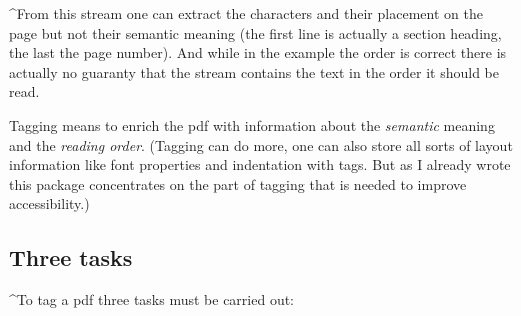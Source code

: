 \documentclass[DIV=12,parskip=half-,bibliography=totoc]{scrartcl}
\begin{document}
\TagP^From this stream one can extract the characters and their placement on the page but not their semantic meaning  (the first line is actually a section heading, the last the page number). And while in the example the order is correct there is actually no guaranty that the stream contains the text in the order it should be read.

\TagP Tagging means to enrich the pdf with information about the \emph{semantic} meaning and the \emph{reading order}. (Tagging can do more, one can also store all sorts of layout information like font properties and indentation with tags. But as I already wrote this package concentrates on the part of tagging that is needed to improve accessibility.)\TagPend




\subsection{Three tasks}
\TagP^To tag a pdf three tasks must be  carried out:\TagPend
\end{document}

